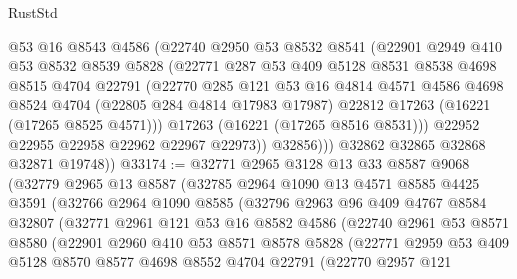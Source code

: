 \begin{lexlean}{RustStd}
\begin{coremodule}
              @53
              @16
              @8543
              @4586
              (@22740
                @2950
                @53
                @8532
                @8541
                (@22901
                  @2949
                  @410
                  @53
                  @8532
                  @8539
                  @5828
                  (@22771
                    @287
                    @53
                    @409
                    @5128
                    @8531
                    @8538
                    @4698
                    @8515
                    @4704
                    @22791
                    (@22770
                      @285
                      @121
                      @53
                      @16
                      @4814
                      @4571
                      @4586
                      @4698
                      @8524
                      @4704
                      (@22805 @284 @4814 @17983 @17987)
                      @22812
                      @17263
                      (@16221 (@17265 @8525 @4571)))
                    @17263
                    (@16221 (@17265 @8516 @8531)))
                  @22952
                  @22955
                  @22958
                  @22962
                  @22967
                  @22973))
              @32856)))
        @32862
        @32865
        @32868
        @32871
        @19748))
@33174 := @32771
    @2965
    @3128
    @13
    @33
    @8587
    @9068
    (@32779
      @2965
      @13
      @8587
      (@32785
        @2964
        @1090
        @13
        @4571
        @8585
        @4425
        @3591
        (@32766
          @2964
          @1090
          @8585
          (@32796
            @2963
            @96
            @409
            @4767
            @8584
            @32807
            (@32771
              @2961
              @121
              @53
              @16
              @8582
              @4586
              (@22740
                @2961
                @53
                @8571
                @8580
                (@22901
                  @2960
                  @410
                  @53
                  @8571
                  @8578
                  @5828
                  (@22771
                    @2959
                    @53
                    @409
                    @5128
                    @8570
                    @8577
                    @4698
                    @8552
                    @4704
                    @22791
                    (@22770
                      @2957
                      @121

\end{coremodule}
\end{lexlean}
